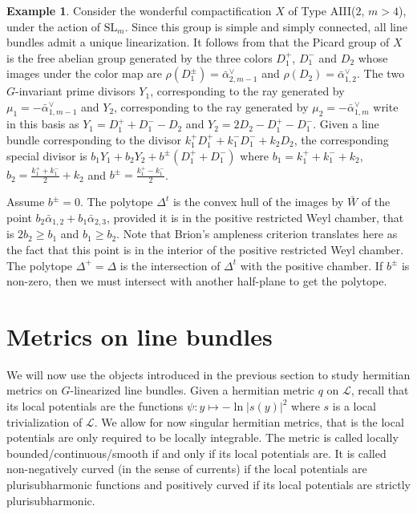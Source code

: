 \documentclass{amsart}
\theoremstyle{definition}
\newtheorem{exa}[thm]{Example}
\begin{document}
\begin{exa} 
\label{exa_pic_wondAIII}
Consider the wonderful compactification $X$ of Type AIII($2$, $m>4$), under 
the action of $\mathrm{SL}_m$. Since this group is simple and simply connected, 
all line bundles admit a unique linearization. 
It follows from \cite{Bri89} that the Picard group of $X$ is the free abelian 
group generated by the three colors $D_1^+$, $D_1^-$ and $D_2$ whose images 
under the color map are $\rho(D_1^{\pm})=\bar{\alpha}_{2,m-1}^{\vee}$ and 
$\rho(D_2)=\bar{\alpha}_{1,2}^{\vee}$. 
The two $G$-invariant prime divisors $Y_1$, corresponding to the ray generated by 
$\mu_1=-\bar{\alpha}_{1,m-1}^{\vee}$ and $Y_2$, corresponding to the ray generated by 
$\mu_2=-\bar{\alpha}_{1,m}^{\vee}$ write in this basis as 
$Y_1=D_1^++D_1^--D_2$ and 
$Y_2=2D_2-D_1^+-D_1^-$. 
Given a line bundle corresponding to the divisor $k_1^+D_1^++k_1^-D_1^-+k_2D_2$, 
the corresponding special divisor is 
$b_1Y_1+b_2Y_2+b^{\pm}(D_1^++D_1^-)$ where $b_1=k_1^++k_1^-+k_2$, 
$b_2= \frac{k_1^++k_1^-}{2}+k_2$ and $b^{\pm}=\frac{k_1^+-k_1^-}{2}$.

Assume $b^{\pm}=0$.
The polytope $\Delta^t$ is the convex hull of the images by $\bar{W}$ of the 
point $b_2\bar{\alpha}_{1,2}+b_1\bar{\alpha}_{2,3}$, provided it is in the 
positive restricted Weyl chamber, that is $2b_2\geq b_1$ and $b_1\geq b_2$.
Note that Brion's ampleness criterion translates here as the fact that this 
point is in the interior of the positive restricted Weyl chamber. 
The polytope $\Delta^+=\Delta$ is the intersection of $\Delta^t$ with the 
positive chamber. 
If $b^{\pm}$ is non-zero, then we must intersect with another half-plane 
to get the polytope. 
\end{exa} 

\section{Metrics on line bundles}

\label{sec_metrics}

We will now use the objects introduced in the previous section to study 
hermitian metrics on $G$-linearized line bundles. 
Given a hermitian metric $q$ on $\mathcal{L}$, recall that its local 
potentials are the functions $\psi:y\mapsto -\ln|s(y)|^2$ where $s$ 
is a local trivialization of $\mathcal{L}$. 
We allow for now singular hermitian metrics, that is the local potentials 
are only required to be locally integrable. 
The metric is called locally bounded/continuous/smooth if and only 
if its local potentials are. 
It is called non-negatively curved (in the sense of currents) if 
the local potentials are plurisubharmonic functions and positively 
curved if its local potentials are strictly plurisubharmonic.
\end{document}
